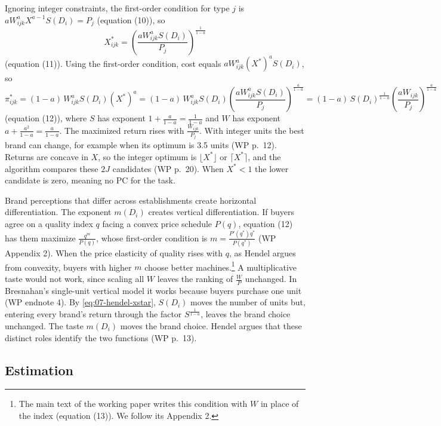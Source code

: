Ignoring integer constraints, the first-order condition for type $j$ is $aW_{ijk}^{a}X^{a-1}S(D_i) = P_j$ (equation
(10)), so
\begin{equation}\label{eq:07-hendel-xstar}
X^*_{ijk} = \left(\frac{aW_{ijk}^{a}S(D_i)}{P_j}\right)^{\frac{1}{1-a}}
\end{equation}
(equation (11)). Using the first-order condition, cost equals $aW_{ijk}^{a}(X^*)^{a}S(D_i)$, so
\begin{equation*}
\pi^*_{ijk} = (1-a)\,W_{ijk}^{a}S(D_i)(X^*)^{a}
= (1-a)\,W_{ijk}^{a}S(D_i)\left(\frac{aW_{ijk}^{a}S(D_i)}{P_j}\right)^{\frac{a}{1-a}}
= (1-a)\,S(D_i)^{\frac{1}{1-a}}\left(\frac{aW_{ijk}}{P_j}\right)^{\frac{a}{1-a}}
\end{equation*}
(equation (12)), where $S$ has exponent $1 + \frac{a}{1-a} = \frac{1}{1-a}$ and $W$ has exponent $a + \frac{a^2}{1-a}
= \frac{a}{1-a}$. The maximized return rises with $\frac{W_{ijk}}{P_j}$. With integer units the best brand can
change, for example when its optimum is 3.5 units (WP p.~12). Returns are concave in $X$, so the integer optimum
is $\lfloor X^*\rfloor$ or $\lceil X^*\rceil$, and the algorithm compares these $2J$ candidates (WP p.~20). When
$X^* < 1$ the lower candidate is zero, meaning no PC for the task.

Brand perceptions that differ across establishments create horizontal differentiation. The exponent $m(D_i)$
creates vertical differentiation. If buyers agree on a quality index $q$ facing a convex price schedule $P(q)$,
equation (12) has them maximize $\frac{q^m}{P(q)}$, whose first-order condition is $m = \frac{P'(q^*)q^*}{P(q^*)}$
(WP Appendix 2). When the price elasticity of quality rises with $q$, as Hendel argues from convexity, buyers with
higher $m$ choose better machines.\footnote{The main text of the working paper writes this condition with $W$ in
place of the index (equation (13)). We follow its Appendix 2.} A multiplicative taste would not work, since scaling
all $W$ leaves the ranking of $\frac{W}{P}$ unchanged. In Bresnahan's single-unit vertical model it works because
buyers purchase one unit (WP endnote 4). By \eqref{eq:07-hendel-xstar}, $S(D_i)$ moves the number of units but,
entering every brand's return through the factor $S^{\frac{1}{1-a}}$, leaves the brand choice unchanged. The taste
$m(D_i)$ moves the brand choice. Hendel argues that these distinct roles identify the two functions (WP p.~13).

\subsection{Estimation}\label{sec:07-hendel-estimation}

